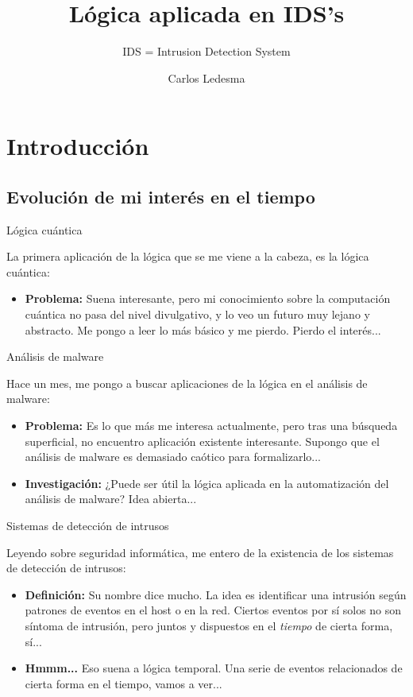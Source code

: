 \documentclass{beamer}
\title{Lógica aplicada en IDS's}
\subtitle{IDS = Intrusion Detection System}
\author{Carlos Ledesma}
\institute{Gestión Inteligente de la Información}
\date{}
\begin{document}
\begin{frame}
\titlepage
\end{frame}

\section{Introducción}

\subsection{Evolución de mi interés en el tiempo}

\begin{frame}{Lógica cuántica}

La primera aplicación de la lógica que se me viene a la cabeza, es la lógica cuántica:

\begin{itemize}
	\item \textbf{Problema:} Suena interesante, pero mi conocimiento sobre la computación cuántica no pasa del nivel divulgativo, y lo veo un futuro muy lejano y abstracto. Me pongo a leer lo más básico y me pierdo. Pierdo el interés...
\end{itemize}

\end{frame}

\begin{frame}{Análisis de malware}

Hace un mes, me pongo a buscar aplicaciones de la lógica en el análisis de malware:

\begin{itemize}
	\item \textbf{Problema:} Es lo que más me interesa actualmente, pero tras una búsqueda superficial, no encuentro aplicación existente interesante. Supongo que el análisis de malware es demasiado caótico para formalizarlo...
	\item \textbf{Investigación:} ¿Puede ser útil la lógica aplicada en la automatización del análisis de malware? Idea abierta...
\end{itemize}

\end{frame}

\begin{frame}{Sistemas de detección de intrusos}

Leyendo sobre seguridad informática, me entero de la existencia de los sistemas de detección de intrusos:

\begin{itemize}
	\item \textbf{Definición:} Su nombre dice mucho. La idea es identificar una intrusión según patrones de eventos en el host o en la red. Ciertos eventos por sí solos no son síntoma de intrusión, pero juntos y dispuestos en el \emph{tiempo} de cierta forma, sí...
	\item \textbf{Hmmm...} Eso suena a lógica temporal. Una serie de eventos relacionados de cierta forma en el tiempo, vamos a ver...
\end{itemize}

\end{frame}
\end{document}
